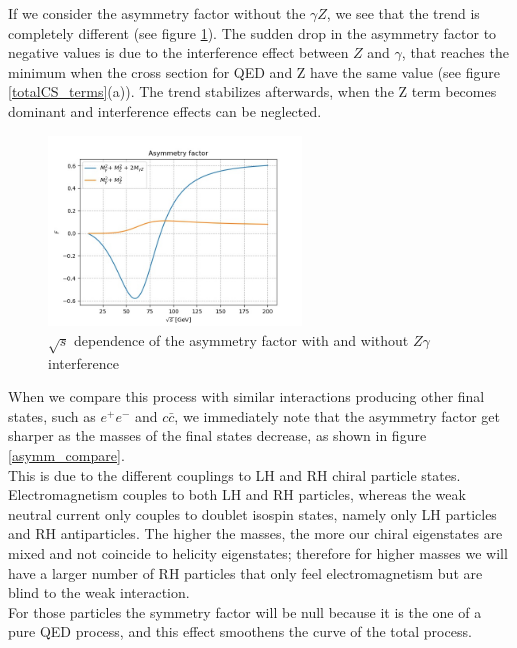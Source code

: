 \documentclass[12pt,letterpaper]{article}
\begin{document}
If we consider the asymmetry factor without the $\gamma Z$, we see that the trend is completely different (see figure \ref{asymm_noint}). The sudden drop in the asymmetry factor to negative values is due to the interference effect between $Z$ and $\gamma$, that reaches the minimum when the cross section for QED and Z have the same value (see figure \ref{totalCS_terms}(a)). The trend stabilizes afterwards, when the Z term becomes dominant and interference effects can be neglected.

\begin{figure}[!ht]
\centering
\includegraphics[width=0.6\textwidth]{figures/Asymm_noint.jpg}
\caption{$\sqrt{s}$ dependence of the asymmetry factor with and without $Z\gamma$ interference}
\label{asymm_noint}
\end{figure}

When we compare this process with similar interactions producing other final states, such as $e^+e^-$ and $c\bar{c}$, we immediately note that the asymmetry factor get sharper as the masses of the final states decrease, as shown in figure \ref{asymm_compare}. \\
This is due to the different couplings to LH and RH chiral particle states. Electromagnetism couples to both LH and RH particles, whereas the weak neutral current only couples to doublet isospin states, namely only LH particles and RH antiparticles. The higher the masses, the more our chiral eigenstates are mixed and not coincide to helicity eigenstates; therefore for higher masses we will have a larger number of RH particles that only feel electromagnetism but are blind to the weak interaction. \\
For those particles the symmetry factor will be null because it is the one of a pure QED process, and this effect smoothens the curve of the total process.
\end{document}

